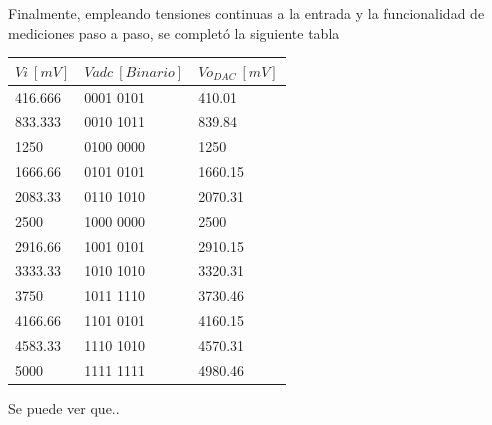 Finalmente, empleando tensiones continuas a la entrada y la funcionalidad de mediciones paso a paso, se completó la siguiente tabla

\begin{table}[H]
\begin{tabular}{@{}lll@{}}
\toprule
$Vi \ [mV]$ & $Vadc \ [Binario]$ & $Vo_{DAC} \ [mV]$ \\ \midrule
416.666 & 0001 0101 & 410.01 \\
833.333 & 0010 1011 & 839.84 \\
1250 & 0100 0000 & 1250 \\
1666.66 & 0101 0101 & 1660.15 \\
2083.33 & 0110 1010 & 2070.31 \\
2500 & 1000 0000 & 2500 \\
2916.66 & 1001 0101 & 2910.15 \\
3333.33 & 1010 1010 & 3320.31 \\
3750 & 1011 1110 & 3730.46 \\
4166.66 & 1101 0101 & 4160.15 \\
4583.33 & 1110 1010 & 4570.31 \\
5000 & 1111 1111 & 4980.46 \\ \bottomrule
\end{tabular}
\end{table}

Se puede ver que..

